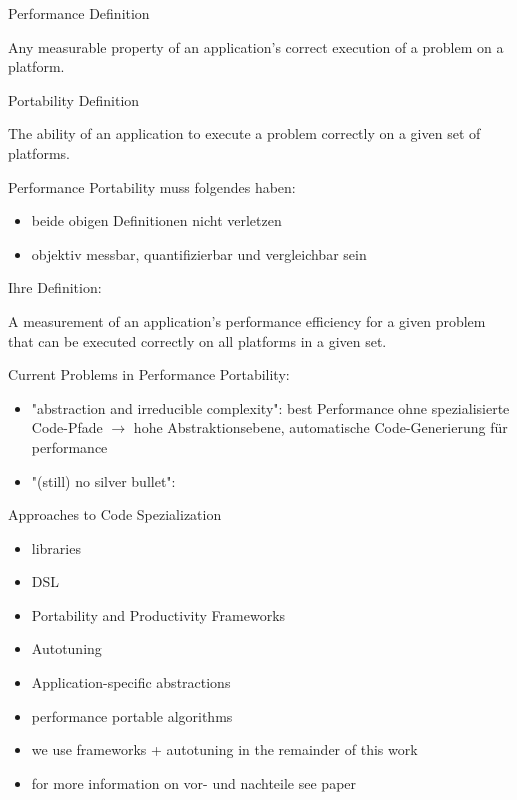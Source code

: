 Performance Definition
\begin{quotebox}{\cite{pennycook_implications_2019}}
    Any measurable property of an application’s correct execution of a problem on a platform.
\end{quotebox}

Portability Definition
\begin{quotebox}{\cite{pennycook_implications_2019}}
    The ability of an application to execute a problem correctly on a given set of platforms.
\end{quotebox}

Performance Portability muss folgendes haben: 
\begin{itemize}
    \item beide obigen Definitionen nicht verletzen
    \item objektiv messbar, quantifizierbar und vergleichbar sein
\end{itemize}

Ihre Definition:
\begin{quotebox}{\cite{pennycook_implications_2019}}
    A measurement of an application’s performance efficiency for a given problem that can be executed correctly on all platforms in a given set.
\end{quotebox}


Current Problems in Performance Portability:
\begin{itemize}
    \item "abstraction and irreducible complexity": best Performance ohne spezialisierte Code-Pfade $\rightarrow$ hohe Abstraktionsebene, automatische Code-Generierung für performance
    \item "(still) no silver bullet": 
\end{itemize}

Approaches to Code Spezialization
\begin{itemize}
    \item libraries
    \item DSL
    \item Portability and Productivity Frameworks
    \item Autotuning
    \item Application-specific abstractions
    \item performance portable algorithms

    \item we use frameworks + autotuning in the remainder of this work
    \item for more information on vor- und nachteile see paper \cite{pennycook_implications_2019}
\end{itemize}

